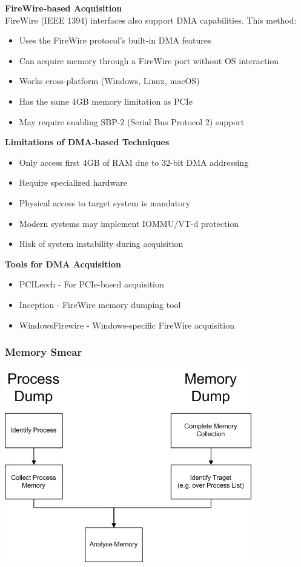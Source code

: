 \textbf{FireWire-based Acquisition}\\
FireWire (IEEE 1394) interfaces also support DMA capabilities. This method:
\begin{itemize}
    \item Uses the FireWire protocol's built-in DMA features
    \item Can acquire memory through a FireWire port without OS interaction
    \item Works cross-platform (Windows, Linux, macOS)
    \item Has the same 4GB memory limitation as PCIe
    \item May require enabling SBP-2 (Serial Bus Protocol 2) support
\end{itemize}

\textbf{Limitations of DMA-based Techniques}
\begin{itemize}
    \item Only access first 4GB of RAM due to 32-bit DMA addressing
    \item Require specialized hardware
    \item Physical access to target system is mandatory
    \item Modern systems may implement IOMMU/VT-d protection
    \item Risk of system instability during acquisition
\end{itemize}

\textbf{Tools for DMA Acquisition}
\begin{itemize}
    \item PCILeech - For PCIe-based acquisition
    \item Inception - FireWire memory dumping tool
    \item WindowsFirewire - Windows-specific FireWire acquisition
\end{itemize}

\subsubsection*{Memory Smear}
\begin{center}
\includegraphics[width=\textwidth]{resources/13-memory-smear.png}
\end{center}

